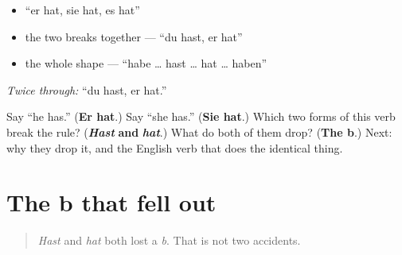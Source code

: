 \begin{itemize}
\raggedright
  \item \textquotedblleft{}er hat, sie hat, es hat\textquotedblright{}
  \item the two breaks together — \textquotedblleft{}du hast, er hat\textquotedblright{}
  \item the whole shape — \textquotedblleft{}habe … hast … hat … haben\textquotedblright{}
\end{itemize}

\emph{Twice through:} \textquotedblleft{}du hast, er hat.\textquotedblright{}

\begin{tcolorbox}[breakable,colback=teal!4,colframe=teal!35!black,title={Before you move on}]
Say \textquotedblleft{}he has.\textquotedblright{} (\textbf{Er hat}.) Say \textquotedblleft{}she has.\textquotedblright{} (\textbf{Sie hat}.) Which two forms of this verb break the rule? (\emph{\textbf{Hast}} \textbf{and} \emph{\textbf{hat}}.) What do both of them drop? (\textbf{The b}.) Next: why they drop it, and the English verb that does the identical thing.
\end{tcolorbox}
\section[der verlorene b]{The b that fell out}

\label{lesson:GE-C14-b-verlust}



\begin{quote}
\emph{Hast} and \emph{hat} both lost a \emph{b}. That is not two accidents.
\end{quote}

